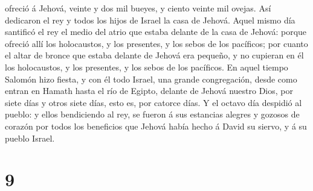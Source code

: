 ofreció á Jehová, veinte y dos mil bueyes, y ciento veinte mil ovejas.
Así dedicaron el rey y todos los hijos de Israel la casa de Jehová.
 Aquel mismo día santificó el rey el medio del atrio que
estaba delante de la casa de Jehová: porque ofreció allí los
holocaustos, y los presentes, y los sebos de los pacíficos; por cuanto
el altar de bronce que estaba delante de Jehová era pequeño, y no
cupieran en él los holocaustos, y los presentes, y los sebos de los
pacíficos.  En aquel tiempo Salomón hizo fiesta, y con él
todo Israel, una grande congregación, desde como entran en Hamath hasta
el río de Egipto, delante de Jehová nuestro Dios, por siete días y otros
siete días, esto es, por catorce días.  Y el octavo día
despidió al pueblo: y ellos bendiciendo al rey, se fueron á sus
estancias alegres y gozosos de corazón por todos los beneficios que
Jehová había hecho á David su siervo, y á su pueblo Israel.

\hypertarget{section-8}{%
\section{9}\label{section-8}}

